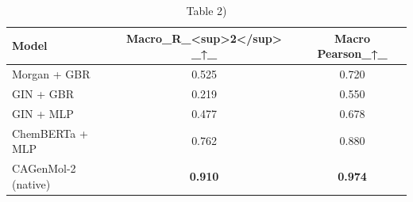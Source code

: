 \begin{table}[t]
\centering
\caption{Table 2)}
\label{tab:2609.34301}
\begin{tabular}{lcc}
\toprule
Model & Macro\_R\_<sup>2</sup> \_↑\_ & Macro Pearson\_↑\_ \\
\midrule
Morgan + GBR & 0.525 & 0.720 \\
GIN + GBR & 0.219 & 0.550 \\
GIN + MLP & 0.477 & 0.678 \\
ChemBERTa + MLP & 0.762 & 0.880 \\
CAGenMol-2 (native) & \textbf{0.910} & \textbf{0.974} \\
\bottomrule
\end{tabular}
\end{table}
